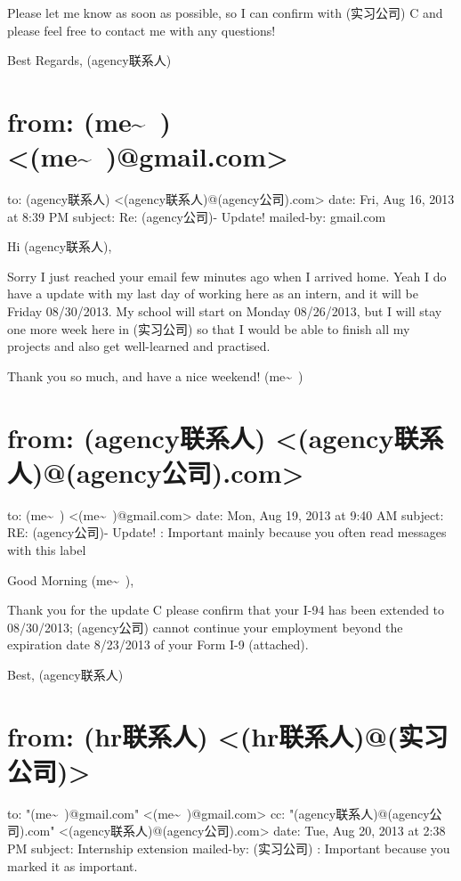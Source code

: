 \documentclass[12pt]{book}
\begin{document}
Please let me know as soon as possible, so I can confirm with (实习公司) C and please feel free to contact me with any questions!

Best Regards,
(agency联系人)


\section{from:         (me\textasciitilde{}~) <(me\textasciitilde{}~)@gmail.com>}
\label{sec-35-2}
to:         (agency联系人) <(agency联系人)@(agency公司).com>
date:         Fri, Aug 16, 2013 at 8:39 PM
subject:         Re: (agency公司)- Update!
mailed-by:         gmail.com

Hi (agency联系人), 

Sorry I just reached your email few minutes ago when I arrived home. Yeah I do have a update with my last day of working here as an intern, and it will be Friday 08/30/2013. My school will start on Monday 08/26/2013, but I will stay one more week here in (实习公司) so that I would be able to finish all my projects and also get well-learned and practised. 

Thank you so much, and have a nice weekend!
(me\textasciitilde{}~)


\section{from:         (agency联系人) <(agency联系人)@(agency公司).com>}
\label{sec-35-3}
to:         (me\textasciitilde{}~) <(me\textasciitilde{}~)@gmail.com>
date:         Mon, Aug 19, 2013 at 9:40 AM
subject:         RE: (agency公司)- Update!
:         Important mainly because you often read messages with this label

Good Morning (me\textasciitilde{}~),

Thank you for the update C please confirm that your I-94 has been extended to 08/30/2013; (agency公司) cannot continue your employment beyond the expiration date 8/23/2013 of your Form I-9 (attached).

Best,
(agency联系人)


\section{from:         (hr联系人) <(hr联系人)@(实习公司)>}
\label{sec-35-4}
to:         "(me\textasciitilde{}~)@gmail.com" <(me\textasciitilde{}~)@gmail.com>
cc:         "(agency联系人)@(agency公司).com" <(agency联系人)@(agency公司).com>
date:         Tue, Aug 20, 2013 at 2:38 PM
subject:         Internship extension
mailed-by:         (实习公司)
:         Important because you marked it as important.
\end{document}

